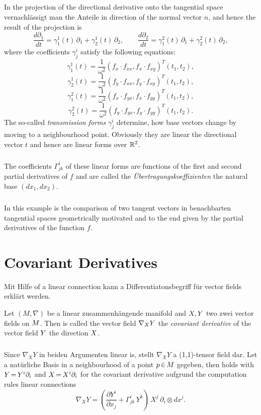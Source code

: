 \documentclass[11pt,twoside]{article}
\begin{document}
\begin{example}
\subparagraph{}
In the projection of the directional derivative onto the tangential space
vernachl\"assigt man the Anteile in direction of the normal vector $n$,
and hence the result of the projection is
\[
\frac {d \partial_1}{dt} =
\gamma^1_1(t) \, \partial_1 + \gamma^1_2(t) \, \partial_2, \qquad
\frac {d \partial_2}{dt} =
\gamma^2_1(t) \, \partial_1 + \gamma^2_2(t) \, \partial_2,
\]
where the coefficients $\gamma^i_j$ satisfy the following equations:
\[
\gamma^1_1(t) = \frac{1}{\omega^2}
(f_x \cdot f_{xx}, f_x \cdot f_{xy})^T (t_1,t_2),
\]
\[
\gamma^1_2(t) = \frac{1}{\omega^2}
(f_y \cdot f_{xx}, f_y \cdot f_{xy})^T (t_1,t_2),
\]
\[
\gamma^2_1(t) = \frac{1}{\omega^2}
(f_x \cdot f_{yx}, f_x \cdot f_{yy})^T (t_1,t_2),
\]
\[
\gamma^2_2(t) = \frac{1}{\omega^2}
(f_y \cdot f_{yx}, f_y \cdot f_{yy})^T (t_1,t_2).
\]
The so-called \textit{transmission forms} $\gamma^i_j$ determine,
how base vectors change by moving to a neighbourhood point.
Obviously they are linear {\wrt} the directional vector $t$ and hence
are linear forms over ${\mathbb{R}}^2$.

\subparagraph{}
The coefficients $\Gamma^i_{jk}$ of these linear forms are functions of
the first and second partial derivatives of $f$ and are called the
\textit{\"Ubertragungskoeffizienten} {\wrt} the natural base $(dx_1, dx_2)$.

\subparagraph{}
In this example is the comparison of two tangent vectors in benachbarten
tangential spaces geometrically motivated and to the end
given by the partial derivatives of the function $f$.
\end{example}

\section{Covariant Derivatives}
Mit Hilfe of a linear connection kann a Differentiatonsbegriff f\"ur
vector fields erkl\"art werden.

\begin{definition}
Let $(M,\nabla)$ be a linear zusammenh\"angende manifold
and $X,Y$ two zwei vector fields on ${M}$.
Then is called the vector field $\nabla_{X} Y$
the \textit{covariant derivative}
of the vector field $Y$ {\wrt} the direction $X$.
\end{definition}

\subparagraph{}
Since $\nabla_X Y$ in beiden Argumenten linear is,
stellt $\nabla_X Y$ a (1,1)-tensor field dar.
Let a nat\"urliche Basis in a neighbourhood of a point $p {\,\in\,} {M}$ gegeben,
then holds with $Y {\,=\,} Y^i \partial_i$ and $X {\,=\,} X^i \partial_i$ for the covariant
derivative aufgrund the computation rules {\wrt} linear connections
\[
\nabla_X Y =
(\frac{\partial Y^i}{\partial x_j} + \Gamma^i_{jk} \, Y^k) \, X^j \,
\partial_i \otimes dx^j.
\]
\end{document}
